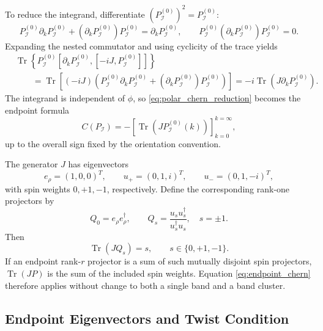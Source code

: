 \documentclass[11pt]{article}
\numberwithin{equation}{section}
\begin{document}
To reduce the integrand, differentiate
$(P_{\mathcal I}^{(0)})^2=P_{\mathcal I}^{(0)}$:
\begin{equation}
  P_{\mathcal I}^{(0)}\partial_kP_{\mathcal I}^{(0)}
  +(\partial_kP_{\mathcal I}^{(0)})P_{\mathcal I}^{(0)}
  =\partial_kP_{\mathcal I}^{(0)},
  \qquad
  P_{\mathcal I}^{(0)}(\partial_kP_{\mathcal I}^{(0)})
  P_{\mathcal I}^{(0)}=0.
\end{equation}
Expanding the nested commutator and using cyclicity of the trace yields
\begin{align}
  &\operatorname{Tr}\!\left\{
  P_{\mathcal I}^{(0)}
  [\partial_kP_{\mathcal I}^{(0)},[-iJ,P_{\mathcal I}^{(0)}]]
  \right\}\nonumber\\
  &\hspace{2em}=\operatorname{Tr}\!\left[
  (-iJ)\left(
  P_{\mathcal I}^{(0)}\partial_kP_{\mathcal I}^{(0)}
  +(\partial_kP_{\mathcal I}^{(0)})P_{\mathcal I}^{(0)}
  \right)\right]
  =-i\operatorname{Tr}(J\partial_kP_{\mathcal I}^{(0)}).
  \label{eq:nested_commutator_identity}
\end{align}
The integrand is independent of $\phi$, so
\eqref{eq:polar_chern_reduction} becomes the endpoint formula
\begin{equation}
  C(P_{\mathcal I})=
  -\left[
  \operatorname{Tr}(J P_{\mathcal I}^{(0)}(k))
  \right]_{k=0}^{k=\infty},
  \label{eq:endpoint_chern}
\end{equation}
up to the overall sign fixed by the orientation convention.

The generator $J$ has eigenvectors
\begin{equation}
  e_\rho=(1,0,0)^T,\qquad
  u_+=(0,1,i)^T,\qquad
  u_-=(0,1,-i)^T,
\end{equation}
with spin weights $0,+1,-1$, respectively.
Define the corresponding rank-one projectors by
\begin{equation}
  Q_0=e_\rho e_\rho^\dagger,
  \qquad
  Q_s=\frac{u_su_s^\dagger}{u_s^\dagger u_s},
  \quad s=\pm1 .
\end{equation}
Then
\begin{equation}
  \operatorname{Tr}(JQ_s)=s,
  \qquad s\in\{0,+1,-1\}.
  \label{eq:spin_projector_weight}
\end{equation}
If an endpoint rank-$r$ projector is a sum of such mutually disjoint spin
projectors, $\operatorname{Tr}(JP)$ is the sum of the included spin
weights. Equation \eqref{eq:endpoint_chern} therefore applies without
change to both a single band and a band cluster.

\subsection{Endpoint Eigenvectors and Twist Condition}
\end{document}
